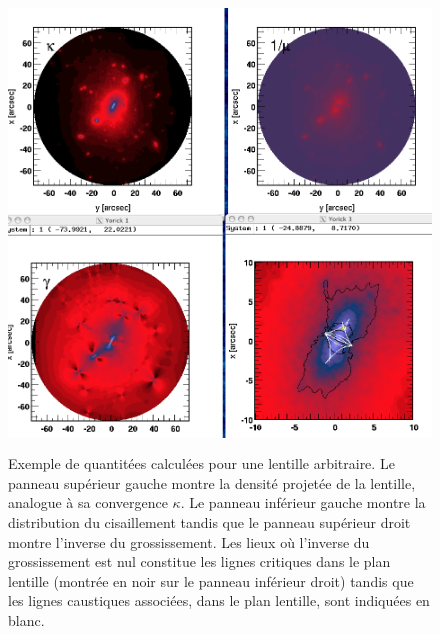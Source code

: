 \begin{figure}[htbp]
	\centering
		\includegraphics[height=12cm]{figs/SPLHALO.png}
	\caption[Les quantités pertinentes d'une lentille gravitationnelle]{Exemple de quantitées calculées pour une lentille arbitraire. Le panneau supérieur gauche montre la densité projetée de la lentille, analogue à sa convergence $\kappa$. Le panneau inférieur gauche montre la distribution du cisaillement tandis que le panneau supérieur droit montre l'inverse du grossissement. Les lieux où l'inverse du grossissement est nul constitue les lignes critiques dans le plan lentille (montrée en noir sur le panneau inférieur droit) tandis que les lignes caustiques associées, dans le plan lentille, sont indiquées en blanc.} 
	\label{f:SPLHALO}
\end{figure}

